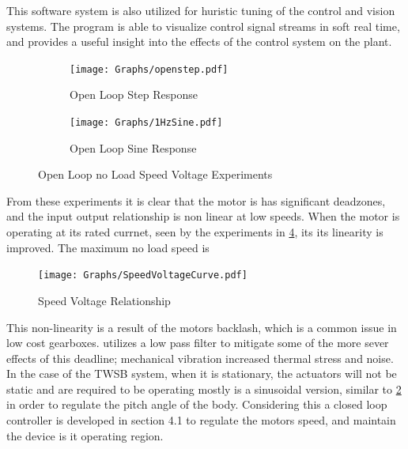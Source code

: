        This software system is also utilized for huristic tuning of the control
        and vision systems. The program is able to visualize control signal streams in soft real time, 
        and provides a useful insight into the effects of the control system on the plant.

        \begin{figure}[H]
            \centering
            \begin{subfigure}[b]{0.45\textwidth}
            \texttt{[image: Graphs/openstep.pdf]}
            \caption{Open Loop Step Response}
            \label{fig:openstep}
            \end{subfigure}
            \hfill
            \begin{subfigure}[b]{0.45\textwidth}
            \texttt{[image: Graphs/1HzSine.pdf]}
            \caption{Open Loop Sine Response}
            \label{fig:opensine}
            \end{subfigure}
            \caption{Open Loop no Load Speed Voltage Experiments}
            \label{fig:openloop}
        \end{figure}


        From these experiments it is clear that the motor is has significant deadzones, 
        and the input output relationship is non linear at low speeds. When the motor is operating at its rated currnet, 
        seen by the experiments in \ref{fig:speedvolt}, its its linearity is improved. The maximum no load speed is  
        \begin{figure}[H]
            \centering
            \texttt{[image: Graphs/SpeedVoltageCurve.pdf]}
            \caption{Speed Voltage Relationship}
            \label{fig:speedvolt}
        \end{figure}

        This non-linearity is a result of the motors backlash, which is a common issue in low cost gearboxes.
        \cite{grasser2002joe} utilizes a low pass filter to mitigate some of the more sever effects of 
        this deadline; mechanical vibration increased thermal stress and noise. 
        In the case of the TWSB system, when it is stationary, 
        the actuators will not be static and are required to be operating mostly is a sinusoidal version, 
        similar to \ref{fig:opensine} in order to regulate the pitch angle of the body.
        Considering this a closed loop controller is developed in section 4.1 to regulate the motors speed,
         and maintain the device is it operating region. 
    \pagebreak{}



